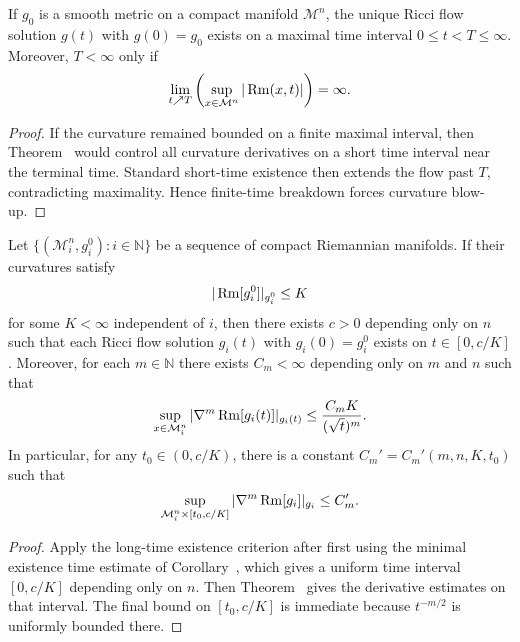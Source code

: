 \begin{corollary}
\label{ch07-cor-long-time-existence}
If \(g_0\) is a smooth metric on a compact manifold \(\mathcal M^n\), the unique Ricci flow solution \(g(t)\) with \(g(0)=g_0\) exists on a maximal time interval \(0\le t<T\le \infty\). Moreover, \(T<\infty\) only if
\[
\lim_{t\nearrow T}\left(\sup_{x\in \mathcal M^n}|\operatorname{Rm}(x,t)|\right)=\infty.
\]
\end{corollary}

\begin{proof}
If the curvature remained bounded on a finite maximal interval, then Theorem~ would control all curvature derivatives on a short time interval near the terminal time. Standard short-time existence then extends the flow past \(T\), contradicting maximality. Hence finite-time breakdown forces curvature blow-up.
\end{proof}

\begin{corollary}
\label{ch07-cor-uniform-bounds-sequences}
Let \(\{(\mathcal M_i^n,g_i^0):i\in\mathbb N\}\) be a sequence of compact Riemannian manifolds. If their curvatures satisfy
\[
|\operatorname{Rm}[g_i^0]|_{g_i^0}\le K
\]
for some \(K<\infty\) independent of \(i\), then there exists \(c>0\) depending only on \(n\) such that each Ricci flow solution \(g_i(t)\) with \(g_i(0)=g_i^0\) exists on \(t\in[0,c/K]\). Moreover, for each \(m\in\mathbb N\) there exists \(C_m<\infty\) depending only on \(m\) and \(n\) such that
\[
\sup_{x\in \mathcal M_i^n}|\nabla^m\operatorname{Rm}[g_i(t)]|_{g_i(t)}\le \frac{C_mK}{(\sqrt t)^m}.
\]
In particular, for any \(t_0\in(0,c/K)\), there is a constant \(C_m'=C_m'(m,n,K,t_0)\) such that
\[
\sup_{\mathcal M_i^n\times[t_0,c/K]}|\nabla^m\operatorname{Rm}[g_i]|_{g_i}\le C_m'.
\]
\end{corollary}

\begin{proof}
Apply the long-time existence criterion after first using the minimal existence time estimate of Corollary~, which gives a uniform time interval \([0,c/K]\) depending only on \(n\). Then Theorem~ gives the derivative estimates on that interval. The final bound on \([t_0,c/K]\) is immediate because \(t^{-m/2}\) is uniformly bounded there.
\end{proof}

